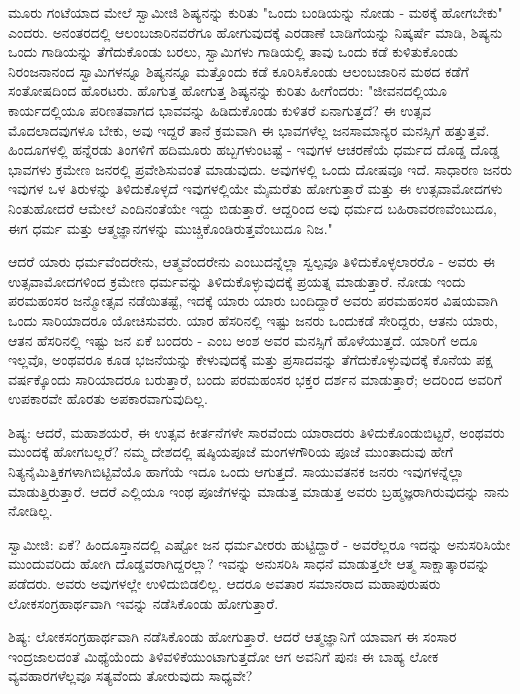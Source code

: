 ಮೂರು ಗಂಟೆಯಾದ ಮೇಲೆ ಸ್ವಾಮೀಜಿ ಶಿಷ್ಯನನ್ನು ಕುರಿತು "ಒಂದು ಬಂಡಿಯನ್ನು ನೋಡು - ಮಠಕ್ಕೆ ಹೋಗಬೇಕು" ಎಂದರು. ಅನಂತರದಲ್ಲಿ ಆಲಂಬಜಾರಿನವರೆಗೂ ಹೋಗುವುದಕ್ಕೆ ಎರಡಾಣೆ ಬಾಡಿಗೆಯನ್ನು ನಿಷ್ಕರ್ಷೆ ಮಾಡಿ, ಶಿಷ್ಯನು ಒಂದು ಗಾಡಿಯನ್ನು ತೆಗೆದುಕೊಂಡು ಬರಲು, ಸ್ವಾಮಿಗಳು ಗಾಡಿಯಲ್ಲಿ ತಾವು ಒಂದು ಕಡೆ ಕುಳಿತುಕೊಂಡು ನಿರಂಜನಾನಂದ ಸ್ವಾಮಿಗಳನ್ನೂ ಶಿಷ್ಯನನ್ನೂ ಮತ್ತೊಂದು ಕಡೆ ಕೂರಿಸಿಕೊಂಡು ಆಲಂಬಜಾರಿನ ಮಠದ ಕಡೆಗೆ ಸಂತೋಷದಿಂದ ಹೊರಟರು. ಹೊಗುತ್ತ ಹೋಗುತ್ತ ಶಿಷ್ಯನನ್ನು ಕುರಿತು ಹೀಗೆಂದರು: "ಜೀವನದಲ್ಲಿಯೂ ಕಾರ್ಯದಲ್ಲಿಯೂ ಪರಿಣತವಾಗದ ಭಾವವನ್ನು ಹಿಡಿದುಕೊಂಡು ಕುಳಿತರೆ ಏನಾಗುತ್ತದೆ? ಈ ಉತ್ಸವ ಮೊದಲಾದವುಗಳೂ ಬೇಕು, ಅವು ಇದ್ದರೆ ತಾನೆ ಕ್ರಮವಾಗಿ ಈ ಭಾವಗಳೆಲ್ಲ ಜನಸಾಮಾನ್ಯರ ಮನಸ್ಸಿಗೆ ಹತ್ತುತ್ತವೆ. ಹಿಂದೂಗಳಲ್ಲಿ ಹನ್ನೆರಡು ತಿಂಗಳಿಗೆ ಹದಿಮೂರು ಹಬ್ಬಗಳುಂಟಷ್ಟೆ - ಇವುಗಳ ಆಚರಣೆಯೆ ಧರ್ಮದ ದೊಡ್ಡ ದೊಡ್ಡ ಭಾವಗಳು ಕ್ರಮೇಣ ಜನರಲ್ಲಿ ಪ್ರವೇಶಿಸುವಂತೆ ಮಾಡುವುದು. ಅವುಗಳಲ್ಲಿ ಒಂದು ದೋಷವೂ ಇದೆ. ಸಾಧಾರಣ ಜನರು ಇವುಗಳ ಒಳ ತಿರುಳನ್ನು ತಿಳಿದುಕೊಳ್ಳದೆ ಇವುಗಳಲ್ಲಿಯೇ ಮೈಮರೆತು ಹೋಗುತ್ತಾರೆ ಮತ್ತು ಈ ಉತ್ಸವಾಮೋದಗಳು ನಿಂತುಹೋದರೆ ಆಮೇಲೆ ಎಂದಿನಂತೆಯೇ ಇದ್ದು ಬಿಡುತ್ತಾರೆ. ಆದ್ದರಿಂದ ಅವು ಧರ್ಮದ ಬಹಿರಾವರಣವೆಂಬುದೂ, ಈಗ ಧರ್ಮ ಮತ್ತು ಆತ್ಮಜ್ಞಾನಗಳನ್ನು ಮುಚ್ಚಿಕೊಂಡಿರುತ್ತವೆಂಬುದೂ ನಿಜ."

ಆದರೆ ಯಾರು ಧರ್ಮವೆಂದರೇನು, ಆತ್ಮವೆಂದರೇನು ಎಂಬುದನ್ನೆಲ್ಲಾ ಸ್ವಲ್ಪವೂ ತಿಳಿದುಕೊಳ್ಳಲಾರರೊ - ಅವರು ಈ ಉತ್ಸವಾಮೋದಗಳಿಂದ ಕ್ರಮೇಣ ಧರ್ಮವನ್ನು ತಿಳಿದುಕೊಳ್ಳುವುದಕ್ಕೆ ಪ್ರಯತ್ನ ಮಾಡುತ್ತಾರೆ. ನೋಡು ಇಂದು ಪರಮಹಂಸರ ಜನ್ಮೋತ್ಸವ ನಡೆಯಿತಷ್ಟೆ, ಇದಕ್ಕೆ ಯಾರು ಯಾರು ಬಂದಿದ್ದಾರೆ ಅವರು ಪರಮಹಂಸರ ವಿಷಯವಾಗಿ ಒಂದು ಸಾರಿಯಾದರೂ ಯೋಚಿಸುವರು. ಯಾರ ಹೆಸರಿನಲ್ಲಿ ಇಷ್ಟು ಜನರು ಒಂದುಕಡೆ ಸೇರಿದ್ದರು, ಆತನು ಯಾರು, ಆತನ ಹೆಸರಿನಲ್ಲಿ ಇಷ್ಟು ಜನ ಏಕೆ ಬಂದರು - ಎಂಬ ಅಂಶ ಅವರ ಮನಸ್ಸಿಗೆ ಹೊಳೆಯುತ್ತದೆ. ಯಾರಿಗೆ ಅದೂ ಇಲ್ಲವೊ, ಅಂಥವರೂ ಕೂಡ ಭಜನೆಯನ್ನು ಕೇಳುವುದಕ್ಕೆ ಮತ್ತು ಪ್ರಸಾದವನ್ನು ತೆಗೆದುಕೊಳ್ಳುವುದಕ್ಕೆ ಕೊನೆಯ ಪಕ್ಷ ವರ್ಷಕ್ಕೊಂದು ಸಾರಿಯಾದರೂ ಬರುತ್ತಾರೆ, ಬಂದು ಪರಮಹಂಸರ ಭಕ್ತರ ದರ್ಶನ ಮಾಡುತ್ತಾರೆ; ಅದರಿಂದ ಅವರಿಗೆ ಉಪಕಾರವೇ ಹೊರತು ಅಪಕಾರವಾಗುವುದಿಲ್ಲ.

ಶಿಷ್ಯ: ಆದರೆ, ಮಹಾಶಯರೆ, ಈ ಉತ್ಸವ ಕೀರ್ತನೆಗಳೇ ಸಾರವೆಂದು ಯಾರಾದರು ತಿಳಿದುಕೊಂಡುಬಿಟ್ಟರೆ, ಅಂಥವರು ಮುಂದಕ್ಕೆ ಹೋಗಬಲ್ಲರೆ? ನಮ್ಮ ದೇಶದಲ್ಲಿ ಷಷ್ಠಿಯಪೂಜೆ ಮಂಗಳಗೌರಿಯ ಪೂಜೆ ಮುಂತಾದುವು ಹೇಗೆ ನಿತ್ಯನೈಮಿತ್ತಿಕಗಳಾಗಿಬಿಟ್ಟಿವೆಯೊ ಹಾಗೆಯೆ ಇದೂ ಒಂದು ಆಗುತ್ತದೆ. ಸಾಯುವತನಕ ಜನರು ಇವುಗಳನ್ನೆಲ್ಲಾ ಮಾಡುತ್ತಿರುತ್ತಾರೆ. ಆದರೆ ಎಲ್ಲಿಯೂ ಇಂಥ ಪೂಜೆಗಳನ್ನು ಮಾಡುತ್ತ ಮಾಡುತ್ತ ಅವರು ಬ್ರಹ್ಮಜ್ಞರಾಗಿರುವುದನ್ನು ನಾನು ನೋಡಿಲ್ಲ.

ಸ್ವಾಮೀಜಿ: ಏಕೆ? ಹಿಂದೂಸ್ತಾನದಲ್ಲಿ ಎಷ್ಟೋ ಜನ ಧರ್ಮವೀರರು ಹುಟ್ಟಿದ್ದಾರೆ - ಅವರೆಲ್ಲರೂ ಇದನ್ನು ಅನುಸರಿಸಿಯೇ ಮುಂದುವರಿದು ಹೋಗಿ ದೊಡ್ಡವರಾಗಿದ್ದರಲ್ಲಾ? ಇವನ್ನು ಅನುಸರಿಸಿ ಸಾಧನೆ ಮಾಡುತ್ತಲೇ ಆತ್ಮ ಸಾಕ್ಷಾತ್ಕಾರವನ್ನು ಪಡೆದರು. ಅವರು ಅವುಗಳಲ್ಲೇ ಉಳಿದುಬಿಡಲಿಲ್ಲ. ಆದರೂ ಅವತಾರ ಸಮಾನರಾದ ಮಹಾಪುರುಷರು ಲೋಕಸಂಗ್ರಹಾರ್ಥವಾಗಿ ಇವನ್ನು ನಡೆಸಿಕೊಂಡು ಹೋಗುತ್ತಾರೆ.

ಶಿಷ್ಯ: ಲೋಕಸಂಗ್ರಹಾರ್ಥವಾಗಿ ನಡೆಸಿಕೊಂಡು ಹೋಗುತ್ತಾರೆ. ಆದರೆ ಆತ್ಮಜ್ಞಾನಿಗೆ ಯಾವಾಗ ಈ ಸಂಸಾರ ಇಂದ್ರಜಾಲದಂತೆ ಮಿಥ್ಯೆಯೆಂದು ತಿಳಿವಳಿಕೆಯುಂಟಾಗುತ್ತದೋ ಆಗ ಅವನಿಗೆ ಪುನಃ ಈ ಬಾಹ್ಯ ಲೋಕ ವ್ಯವಹಾರಗಳೆಲ್ಲವೂ ಸತ್ಯವೆಂದು ತೋರುವುದು ಸಾಧ್ಯವೇ?

